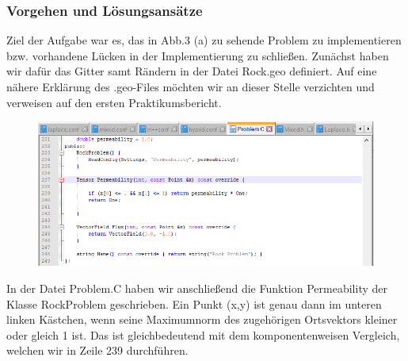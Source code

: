 \subsubsection{Vorgehen und Lösungsansätze}
\begin{figure}[H]
	\centering
\end{figure}
Ziel der Aufgabe war es, das in Abb.3 (a) zu sehende Problem zu implementieren bzw. vorhandene Lücken in der Implementierung zu schließen.
Zunächst haben wir dafür das Gitter samt Rändern in der Datei Rock.geo definiert. 
Auf eine nähere Erklärung des .geo-Files möchten wir an dieser Stelle verzichten und verweisen auf den ersten Praktikumsbericht.


\begin{figure}[H]
	\centering
	\includegraphics[width=\textwidth]{../../19/permprob.png}	
\end{figure}
In der Datei Problem.C haben wir anschließend die Funktion Permeability der Klasse RockProblem geschrieben.
Ein Punkt (x,y) ist genau dann im unteren linken Kästchen, wenn seine Maximumnorm des zugehörigen Ortsvektors kleiner oder gleich 1 ist. 
Das ist gleichbedeutend mit dem komponentenweisen Vergleich, welchen wir in Zeile 239 durchführen.


